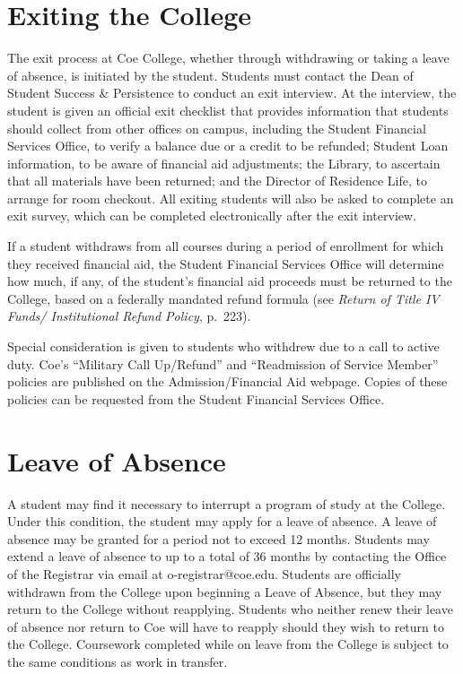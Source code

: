 \documentclass[
  letterpaper,
]{scrbook}
\begin{document}
\section{Exiting the College}\label{exiting-the-college}

The exit process at Coe College, whether through withdrawing or taking a
leave of absence, is initiated by the student. Students must contact the
Dean of Student Success \& Persistence to conduct an exit interview. At
the interview, the student is given an official exit checklist that
provides information that students should collect from other offices on
campus, including the Student Financial Services Office, to verify a
balance due or a credit to be refunded; Student Loan information, to be
aware of financial aid adjustments; the Library, to ascertain that all
materials have been returned; and the Director of Residence Life, to
arrange for room checkout. All exiting students will also be asked to
complete an exit survey, which can be completed electronically after the
exit interview.

If a student withdraws from all courses during a period of enrollment
for which they received financial aid, the Student Financial Services
Office will determine how much, if any, of the student's financial aid
proceeds must be returned to the College, based on a federally mandated
refund formula (see \emph{Return of Title IV Funds/ Institutional Refund
Policy}, p.~223).

Special consideration is given to students who withdrew due to a call to
active duty. Coe's ``Military Call Up/Refund'' and ``Readmission of
Service Member'' policies are published on the Admission/Financial Aid
webpage. Copies of these policies can be requested from the Student
Financial Services Office.

\section{Leave of Absence}\label{leave-of-absence}

A student may find it necessary to interrupt a program of study at the
College. Under this condition, the student may apply for a leave of
absence. A leave of absence may be granted for a period not to exceed 12
months. Students may extend a leave of absence to up to a total of 36
months by contacting the Office of the Registrar via email at
o-registrar@coe.edu. Students are officially withdrawn from the College
upon beginning a Leave of Absence, but they may return to the College
without reapplying. Students who neither renew their leave of absence
nor return to Coe will have to reapply should they wish to return to the
College. Coursework completed while on leave from the College is subject
to the same conditions as work in transfer.
\end{document}
